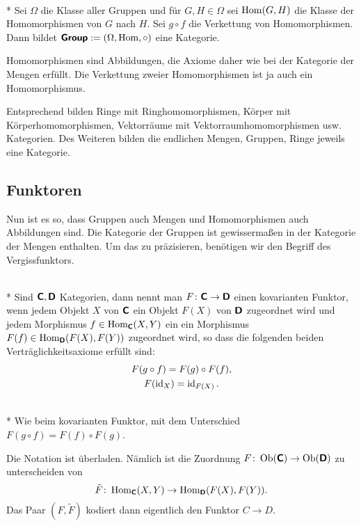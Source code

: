 \begin{Satz}\mbox{}\\*
Sei $\Omega$ die Klasse aller Gruppen und für $G,H\in\Omega$ sei
$\operatorname{Hom}(G,H)$ die Klasse der Homomorphismen von $G$ nach $H$.
Sei $g\circ f$ die Verkettung von Homomorphismen.
Dann bildet $\textsf{\textbf{Group}}:=(\Omega,\operatorname{Hom},\circ)$
eine Kategorie.
\end{Satz}
 Homomorphismen sind Abbildungen, die Axiome
daher wie bei der Kategorie der Mengen erfüllt. Die Verkettung
zweier Homomorphismen ist ja auch ein Homomorphismus.\;\qedsymbol

Entsprechend bilden Ringe mit Ringhomomorphismen, Körper mit
Körperhomomorphismen, Vektorräume mit Vektorraumhomomorphismen
usw. Kategorien. Des Weiteren bilden die endlichen Mengen, Gruppen,
Ringe jeweils eine Kategorie.

\subsection{Funktoren}

Nun ist es so, dass Gruppen auch Mengen und Homomorphismen
auch Abbildungen sind. Die Kategorie der Gruppen ist gewissermaßen
in der Kategorie der Mengen enthalten. Um das zu präzisieren,
benötigen wir den Begriff des Vergissfunktors.

\begin{Definition}\mbox{}\\*
Sind $\textsf{\textbf{C}},\textsf{\textbf{D}}$ Kategorien, dann nennt man
$F\colon\textsf{\textbf{C}}\to\textsf{\textbf{D}}$ einen
kovarianten Funktor, wenn jedem Objekt $X$ von $\textsf{\textbf{C}}$ ein Objekt
$F(X)$ von $\textsf{\textbf{D}}$ zugeordnet wird und jedem Morphismus
$f\in\operatorname{Hom}_{\textsf{\textbf{C}}}(X,Y)$ ein ein Morphismus
$F(f)\in\operatorname{Hom}_{\textsf{\textbf{D}}}(F(X),F(Y))$ zugeordnet wird,
so dass die folgenden beiden Verträglichkeitsaxiome erfüllt sind:%
\begin{gather*}
F(g\circ f) = F(g)\circ F(f),\\
F(\operatorname{id}_X) = \operatorname{id}_{F(X)}.
\end{gather*}
\end{Definition}
\begin{Definition}\mbox{}\\*
Wie beim kovarianten Funktor, mit dem Unterschied
$F(g\circ f) = F(f)\circ F(g)$.
\end{Definition}
 Die Notation ist überladen. Nämlich ist die Zuordnung
$F\colon\operatorname{Ob}(\textsf{\textbf{C}})\to\operatorname{Ob}(\textsf{\textbf{D}})$ zu unterscheiden
von
\[\tilde F\colon\operatorname{Hom}_{\textsf{\textbf{C}}}(X,Y)\to\operatorname{Hom}_{\textsf{\textbf{D}}}(F(X),F(Y)).\]
Das Paar $(F,\tilde F)$ kodiert dann eigentlich den Funktor
$C\to D$.

